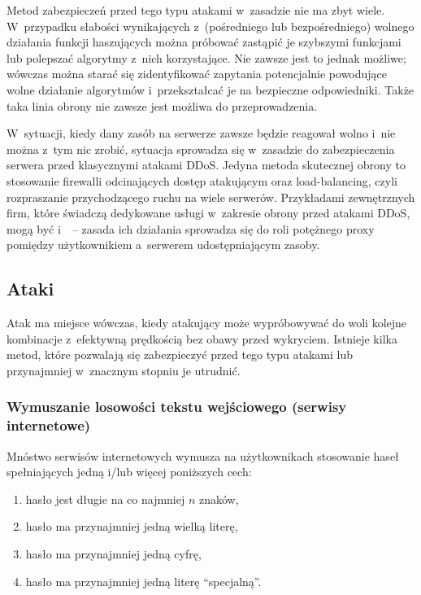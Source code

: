 Metod zabezpieczeń przed tego typu atakami w~zasadzie nie ma zbyt wiele.
W~przypadku słabości wynikających z~(pośredniego lub bezpośredniego) wolnego
działania funkcji haszujących można próbować zastąpić je szybszymi funkcjami
lub polepszać algorytmy z~nich korzystające. Nie zawsze jest to jednak możliwe;
wówczas można starać się zidentyfikować zapytania potencjalnie powodujące wolne
działanie algorytmów i~przekształcać je na bezpieczne odpowiedniki.  Także taka
linia obrony nie zawsze jest możliwa do przeprowadzenia.

W~sytuacji, kiedy dany zasób na serwerze zawsze będzie reagował wolno i~nie
można z~tym nic zrobić, sytuacja sprowadza się w~zasadzie do zabezpieczenia
serwera przed klasycznymi atakami DDoS. Jedyna metoda skutecznej obrony to
stosowanie firewalli odcinających dostęp atakującym oraz load-balancing, czyli
rozpraszanie przychodzącego ruchu na wiele serwerów. Przykładami zewnętrznych
firm, które świadczą dedykowane usługi w~zakresie obrony przed atakami DDoS,
mogą być  i~~-- zasada ich działania sprowadza się do
roli potężnego proxy pomiędzy użytkownikiem a~serwerem udostępniającym zasoby.

\subsection{Ataki }

Atak  ma miejsce wówczas, kiedy atakujący może wypróbowywać do woli
kolejne kombinacje z~efektywną prędkością bez obawy przed wykryciem. Istnieje
kilka metod, które pozwalają się zabezpieczyć przed tego typu atakami lub
przynajmniej w~znacznym stopniu je utrudnić.

\subsubsection{Wymuszanie losowości tekstu wejściowego (serwisy internetowe)}
Mnóstwo serwisów internetowych wymusza na użytkownikach stosowanie haseł
spełniających jedną i/lub więcej poniższych cech:

\begin{enumerate}
\item hasło jest długie na co najmniej $n$ znaków,
\item hasło ma przynajmniej jedną wielką literę,
\item hasło ma przynajmniej jedną cyfrę,
\item hasło ma przynajmniej jedną literę ``specjalną''.
\end{enumerate}

